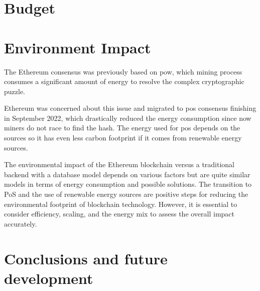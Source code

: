 \documentclass[a4paper,12pt]{article}
\begin{document}
\clearpage

\section{Budget}

\clearpage

\section{Environment Impact}
{
The Ethereum consensus was previously based on \acrlong{pow}, which mining process consumes a significant amount of energy to resolve the complex cryptographic puzzle. 

Ethereum was concerned about this issue and migrated to \acrlong{pos} consensus finishing in September 2022, which drastically reduced the energy consumption since now miners do not race to find the hash. The energy used for \acrshort{pos} depends on the sources so it has even less carbon footprint if it comes from renewable energy sources.

The environmental impact of the Ethereum blockchain versus a traditional backend with a database model depends on various factors but are quite similar models in terms of energy consumption and possible solutions. The transition to PoS and the use of renewable energy sources are positive steps for reducing the environmental footprint of blockchain technology. However, it is essential to consider efficiency, scaling, and the energy mix to assess the overall impact accurately.
}

\clearpage
\section{Conclusions and future development }
\end{document}
